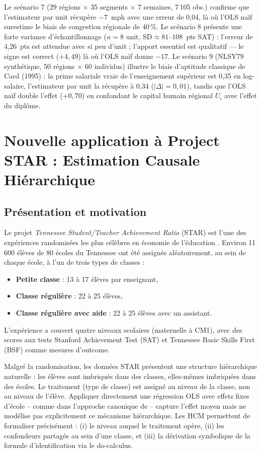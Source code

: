 \documentclass[11pt,a4paper]{article}
\begin{document}
Le scénario 7 (29 régions $\times$ 35 segments $\times$ 7 semaines, 7\,105 obs.) confirme que l'estimateur par unit récupère $-7$~mph avec une erreur de 0{,}04, là où l'OLS naïf surestime le biais de congestion régionale de 40\,\%.
Le scénario 8 présente une forte variance d'échantillonnage ($n=8$ unit, $\mathrm{SD}\approx 81$--$108$~pts SAT) : l'erreur de 4{,}26~pts est attendue avec si peu d'unit ; l'apport essentiel est qualitatif — le signe est correct ($+4{,}49$) là où l'OLS naïf donne $-17$.
Le scénario 9 (NLSY79 synthétique, 50 régions $\times$ 60 individus) illustre le biais d'aptitude classique de Card (1995) : la prime salariale vraie de l'enseignement supérieur est 0{,}35 en log-salaire, l'estimateur par unit la récupère à 0{,}34 ($|\Delta|=0{,}01$), tandis que l'OLS naïf double l'effet ($+0{,}70$) en confondant le capital humain régional $U_i$ avec l'effet du diplôme.

\section{Nouvelle application à Project STAR : Estimation Causale Hiérarchique}
\label{sec:star}

\subsection{Présentation et motivation}

Le projet \emph{Tennessee Student/Teacher Achievement Ratio} (STAR) est l'une des expériences randomisées les plus célèbres en économie de l'éducation \citep{Krueger1999}. Environ 11\,600 élèves de 80 écoles du Tennessee ont été assignés aléatoirement, au sein de chaque école, à l'un de trois types de classes :
\begin{itemize}
  \item \textbf{Petite classe} : 13 à 17 élèves par enseignant,
  \item \textbf{Classe régulière} : 22 à 25 élèves,
  \item \textbf{Classe régulière avec aide} : 22 à 25 élèves avec un assistant.
\end{itemize}
L'expérience a couvert quatre niveaux scolaires (maternelle à CM1), avec des scores aux tests Stanford Achievement Test (SAT) et Tennessee Basic Skills First (BSF) comme mesures d'outcome.

Malgré la randomisation, les données STAR présentent une structure hiérarchique naturelle : les élèves sont imbriqués dans des classes, elles-mêmes imbriquées dans des écoles. Le traitement (type de classe) est assigné au niveau de la classe, non au niveau de l'élève. Appliquer directement une régression OLS avec effets fixes d'école -- comme dans l'approche canonique de \citet{Krueger1999} -- capture l'effet moyen mais ne modélise pas explicitement ce mécanisme hiérarchique. Les HCM permettent de formaliser précisément : (i) le niveau auquel le traitement opère, (ii) les confondeurs partagés au sein d'une classe, et (iii) la dérivation symbolique de la formule d'identification via le do-calculus.
\end{document}
